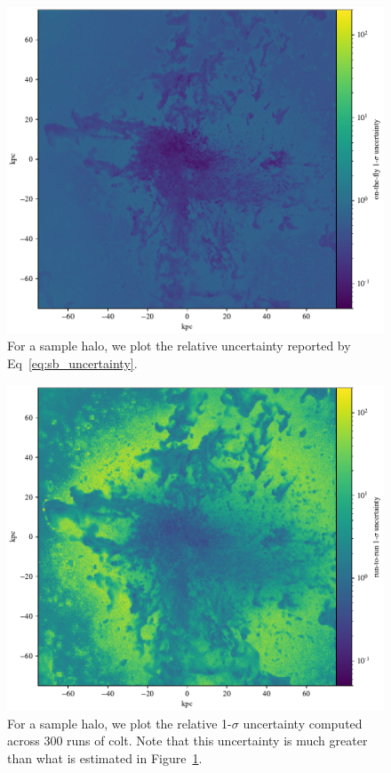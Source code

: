 \begin{figure}
    \centering
    \includegraphics[width=\textwidth,keepaspectratio]{figures/on_the_fly.pdf}
    \caption{
        For a sample halo, we plot the relative uncertainty reported by Eq~\ref{eq:sb_uncertainty}.
    }
  \label{fig:on_the_fly}
\end{figure}

\begin{figure}
    \centering
    \includegraphics[width=\textwidth,keepaspectratio]{figures/run_to_run.pdf}
    \caption{
        For a sample halo, we plot the relative 1-$\sigma$ uncertainty computed across 300 runs of {\sc colt}.
        Note that this uncertainty is much greater than what is estimated in Figure~\ref{fig:on_the_fly}.
    }
  \label{fig:run_to_run}
\end{figure}


